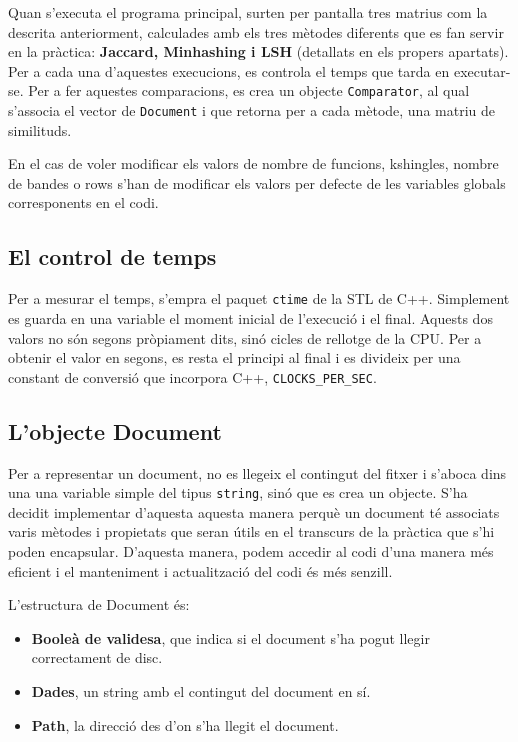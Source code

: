 \documentclass[catalan, 12pt]{report}
\begin{document}
Quan s'executa el programa principal, surten per pantalla tres matrius com la descrita anteriorment, calculades amb els tres mètodes diferents que es fan servir en la pràctica: \textbf{Jaccard, Minhashing i LSH} (detallats en els propers apartats). Per a cada una d'aquestes execucions, es controla el temps que tarda en executar-se. Per a fer aquestes comparacions, es crea un objecte \verb|Comparator|, al qual s'associa el vector de \verb|Document| i que retorna per a cada mètode, una matriu de similituds.\newline

En el cas de voler modificar els valors de nombre de funcions, kshingles, nombre de bandes o rows s'han de modificar els valors per defecte de les variables globals corresponents en el codi.

\subsection{El control de temps}

Per a mesurar el temps, s'empra el paquet \verb|ctime| de la STL de C++. Simplement es guarda en una variable el moment inicial de l'execució i el final. Aquests dos valors no són segons pròpiament dits, sinó cicles de rellotge de la CPU. Per a obtenir el valor en segons, es resta el principi al final i es divideix per una constant de conversió que incorpora C++, \verb|CLOCKS_PER_SEC|.

\subsection{L'objecte Document}

Per a representar un document, no es llegeix el contingut del fitxer i s'aboca dins una una variable simple del tipus \verb|string|, sinó que es crea un objecte. S'ha decidit implementar d'aquesta aquesta manera perquè un document té associats varis mètodes i propietats que seran útils en el transcurs de la pràctica que s'hi poden encapsular. D'aquesta manera, podem accedir al codi d'una manera més eficient i el manteniment i actualització del codi és més senzill.\newline

L'estructura de Document és:

\begin{itemize}
\item \textbf{Booleà de validesa}, que indica si el document s'ha pogut llegir correctament de disc.
\item \textbf{Dades}, un string amb el contingut del document en sí. 
\item \textbf{Path}, la direcció des d'on s'ha llegit el document.
\end{itemize}
\end{document}
